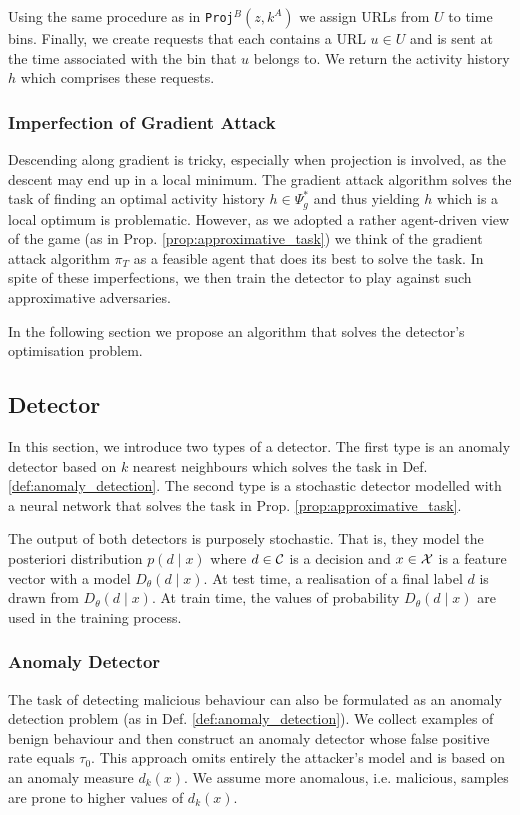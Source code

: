 Using the same procedure as in \texttt{Proj}$^B(z, k^A)$ we assign URLs from $U$ to time bins. Finally, we create requests that each contains a URL $u \in U$ and is sent at the time associated with the bin that $u$ belongs to. We return the activity history $h$ which comprises these requests.

\subsubsection{Imperfection of Gradient Attack}

Descending along gradient is tricky, especially when projection is involved, as the descent may end up in a local minimum. The gradient attack algorithm solves the task of finding an optimal activity history $h \in \Psi^*_g$ and thus yielding $h$ which is a local optimum is problematic. However, as we adopted a rather agent-driven view of the game (as in Prop. \ref{prop:approximative_task}) we think of the gradient attack algorithm $\pi_T$ as a feasible agent that does its best to solve the task. In spite of these imperfections, we then train the detector to play against such approximative adversaries.

In the following section we propose an algorithm that solves the detector's optimisation problem.

\subsection{Detector}
In this section, we introduce two types of a detector. The first type is an anomaly detector based on $k$ nearest neighbours which solves the task in Def. \ref{def:anomaly_detection}. The second type is a stochastic detector modelled with a neural network that solves the task in Prop. \ref{prop:approximative_task}.

The output of both detectors is purposely stochastic. That is, they model the posteriori distribution $p(d \mid x)$ where $d \in \mathcal{C}$ is a decision and $x \in \mathcal{X}$ is a feature vector with a model $D_\theta(d \mid x)$. At test time, a realisation of a final label $d$ is drawn from $D_\theta(d \mid x)$. At train time, the values of probability $D_\theta(d \mid x)$ are used in the training process.

\subsubsection{Anomaly Detector}\label{sec:knn_detector}
The task of detecting malicious behaviour can also be formulated as an anomaly detection problem (as in Def. \ref{def:anomaly_detection}). We collect examples of benign behaviour and then construct an anomaly detector whose false positive rate equals $\tau_0$. This approach omits entirely the attacker's model and is based on an anomaly measure $d_k(x)$. We assume more anomalous, i.e. malicious, samples are prone to higher values of $d_k(x)$.


